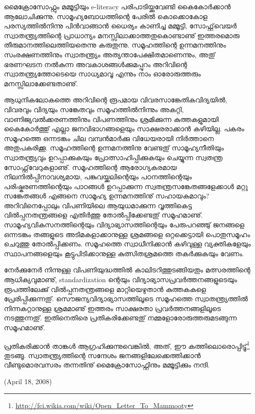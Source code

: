 ﻿
\vskip 2pt

മൈക്രോസോഫ്റ്റും മമ്മൂട്ടിയും e-literacy പരിപാടിയ്ക്കുവേണ്ടി കൈകോര്‍ക്കാന്‍ ആലോചിക്കുന്നു. 
സാമൂഹ്യബോധത്തിന്റെ പേരില്‍ കൊക്കൊകോള പരസ്യത്തില്‍നിന്നു പിന്‍വാങ്ങാന്‍ ധൈര്യം കാണിച്ച മമ്മൂട്ടി, 
സോഫ്റ്റ്‌വെയര്‍ സ്വാതന്ത്ര്യത്തിന്റെ പ്രാധാന്യം മനസ്സിലാക്കാത്തതുകൊണ്ടാണു് ഇത്തരമൊരു തീരുമാനത്തിലെത്തിയതെന്നു 
കരുതുന്നു. സമൂഹത്തിന്റെ ഉന്നമനത്തിനും സംരക്ഷണത്തിനും സ്വാതന്ത്ര്യം അത്യന്താപേക്ഷിതമാണെന്നും, അതു് ഭരണഘടന 
നല്‍കുന്ന അവകാശങ്ങള്‍ക്കുമപ്പുറം അറിവിന്റെ സ്വാതന്ത്ര്യത്തോടെയെ സാധ്യമാവൂ എന്നും നാം ഓരോരുത്തരും 
മനസ്സിലാക്കേണ്ടതാണു്.

ആധുനികലോകത്തെ അറിവിന്റെ രൂപമായ വിവരസാങ്കേതികവിദ്യയില്‍, വിവരവും വിദ്യയും സങ്കേതവും സമൂഹത്തില്‍നിന്നും അകറ്റി, 
വാണിജ്യവല്‍ക്കരണത്തിനും വിപണത്തിനും ശ്രമിക്കുന്ന കുത്തകളുമായി കൈകോര്‍ത്തു് എല്ലാ ജനവിഭാഗങ്ങളെയും 
സാക്ഷരരാക്കാന്‍ കഴിയില്ല. പകരം സമൂഹത്തെ ഒന്നടങ്കം ചില വമ്പന്‍മാര്‍ക്കു വിധേയരായി നിര്‍ത്താനെ അതുപകരിക്കൂ. 
സമൂഹത്തിന്റെ ഉന്നമനത്തിനു വേണ്ടതു് സാമൂഹ്യനീതിയും സ്വാതന്ത്ര്യവും ഉറപ്പാക്കുകയും പ്രോത്സാഹിപ്പിക്കുകയും 
ചെയ്യുന്ന സ്വതന്ത്ര സോഫ്റ്റ്‌വേറുകളാണു്. സമൂഹത്തിന്റെ ആരോഗ്യകരമായ നിലനില്‍പ്പിനാവശ്യമായ, പങ്കുവയ്ക്കലിന്റെയും 
പഠനത്തിന്റെയും പരിഷ്കരണത്തിന്റെയും പാഠങ്ങള്‍ ഉറപ്പാക്കുന്ന സ്വതന്ത്രസങ്കേതങ്ങളേക്കാള്‍ മറ്റു സങ്കേതങ്ങള്‍ എങ്ങനെ 
സാമൂഹ്യ ഉന്നമനത്തിനു് സഹായകമാവും? അറിവിനെപ്പോലും വിപണിയിലെ ആയുധമാക്കുന്ന വൃത്തികെട്ട വില്‍പ്പനതന്ത്രങ്ങളെ 
എതിര്‍ത്തു തോല്‍പ്പിക്കേണ്ടതു് സമൂഹമാണു്. സാമൂഹ്യവികസനത്തിന്റെയും വിദ്യാഭ്യാസത്തിന്റെയും പേരുപറഞ്ഞു് 
ജനങ്ങളെ ഒന്നടങ്കം തങ്ങളുടെ അടിമകളാക്കാനുള്ള ശ്രമങ്ങളെ ഒറ്റക്കെട്ടായി പൊതുസമൂഹം ചെറുത്തു തോല്‍പ്പിക്കണം. 
സമൂഹത്തെ സ്വാധീനിക്കാന്‍ കഴിവുള്ള വ്യക്തികളേയും സ്ഥാപനങ്ങളെയും കൂട്ടുപിടിക്കാനുള്ള കുത്സിതശ്രമത്തെ 
തകര്‍ക്കുകയും വേണം.

നേര്‍ക്കുനേര്‍ നിന്നുള്ള വിപണിയുദ്ധത്തില്‍ കാലിടറിത്തുടങ്ങിയതും മത്സരത്തിന്റെ ആധിക്യവുമാണു്, standardization ന്റെയും 
വിദ്യാഭ്യാസപ്രവര്‍ത്തനങ്ങളുടെയും രൂപത്തിലേക്കു് വില്‍പ്പനതന്ത്രങ്ങളെ മാറ്റിയെഴുതാന്‍ കുത്തകകളെ പ്രേരിപ്പിക്കുന്നതു്. 
 സൌജന്യവിദ്യാഭ്യാസത്തിലൂടെ സമൂഹത്തെ സ്വാതന്ത്ര്യത്തില്‍ നിന്നകറ്റാനുള്ള ശ്രമമാണു് ഇത്തരം സാക്ഷരതാ 
പ്രവര്‍ത്തനങ്ങളിലൂടെ നടത്തുന്നതു്. ഇതിനെതിരെ പ്രതികരിക്കേണ്ടതു് നമ്മളോരോരുത്തരുമടങ്ങുന്ന സമൂഹമാണു്.

പ്രതികരിക്കാന്‍ താങ്കള്‍ ആഗ്രഹിക്കുന്നുവെങ്കില്‍, അത്, 
ഈ കത്തിലൊരൊപ്പിട്ടു്\footnote{\url{http://fci.wikia.com/wiki/Open_Letter_To_Mammooty}} തുടങ്ങൂ. 
സ്വാതന്ത്ര്യത്തിന്റെ സന്ദേശം ജനങ്ങളിലേക്കെത്തിക്കാന്‍ വീണ്ടുമൊരവസരം തന്നതിനു് മൈക്രോസോഫ്റ്റിനും മമ്മൂട്ടിക്കും നന്ദി.

(April 18, 2008)
\newpage
